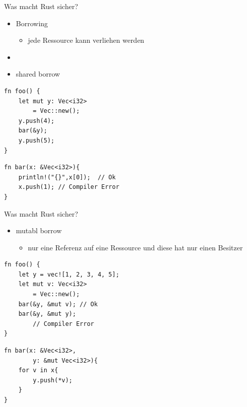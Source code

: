 \documentclass[12pt]{beamer}
\begin{document}
\begin{frame}[fragile=singleslide]{Was macht Rust sicher?}
	\begin{itemize}
	    \item Borrowing
	    \begin{itemize}
	        \item jede Ressource kann verliehen werden
	    \end{itemize}
	    \item[]
	    \item shared borrow  
	\end{itemize}
\begin{minipage}[t]{.49\textwidth}
\begin{lstlisting}
fn foo() {	
	let mut y: Vec<i32> 
		= Vec::new();
	y.push(4);	
	bar(&y);	
	y.push(5);	
}
\end{lstlisting}				
\end{minipage}
\hfill
\begin{minipage}[t]{.49\textwidth}
\begin{lstlisting}
fn bar(x: &Vec<i32>){
	println!("{}",x[0]);  // Ok	
	x.push(1); // Compiler Error
}
\end{lstlisting}				
\end{minipage}
\end{frame}


\begin{frame}[fragile=singleslide]{Was macht Rust sicher?}
	\begin{itemize}
	    \item mutabl borrow  
	    \begin{itemize}
	        \item nur eine Referenz auf eine Ressource und diese hat nur einen Besitzer
	    \end{itemize}
	\end{itemize}
\begin{minipage}[t]{.49\textwidth}
\begin{lstlisting}
fn foo() {	
	let y = vec![1, 2, 3, 4, 5];
	let mut v: Vec<i32> 
		= Vec::new();
	bar(&y, &mut v); // Ok
	bar(&y, &mut y); 
		// Compiler Error
}
\end{lstlisting}				
\end{minipage}
\hfill
\begin{minipage}[t]{.49\textwidth}
\begin{lstlisting}
fn bar(x: &Vec<i32>, 
		y: &mut Vec<i32>){
	for v in x{
		y.push(*v);
	}
}
\end{lstlisting}				
\end{minipage}
\end{frame}
\end{document}
